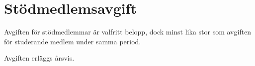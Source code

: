 \section{Stödmedlemsavgift}
Avgiften för stödmedlemmar är valfritt belopp, dock minst lika stor som avgiften för studerande medlem under samma period.

Avgiften erläggs årsvis.
